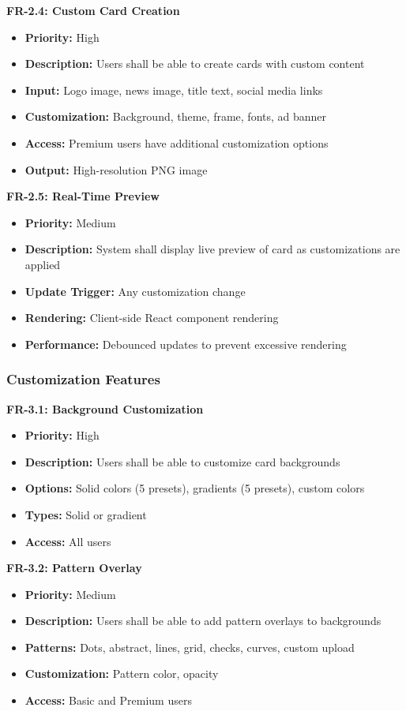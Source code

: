 \documentclass[12pt,a4paper]{article}
\begin{document}
\textbf{FR-2.4: Custom Card Creation}
\begin{itemize}
    \item \textbf{Priority:} High
    \item \textbf{Description:} Users shall be able to create cards with custom content
    \item \textbf{Input:} Logo image, news image, title text, social media links
    \item \textbf{Customization:} Background, theme, frame, fonts, ad banner
    \item \textbf{Access:} Premium users have additional customization options
    \item \textbf{Output:} High-resolution PNG image
\end{itemize}

\textbf{FR-2.5: Real-Time Preview}
\begin{itemize}
    \item \textbf{Priority:} Medium
    \item \textbf{Description:} System shall display live preview of card as customizations are applied
    \item \textbf{Update Trigger:} Any customization change
    \item \textbf{Rendering:} Client-side React component rendering
    \item \textbf{Performance:} Debounced updates to prevent excessive rendering
\end{itemize}

\subsubsection{Customization Features}

\textbf{FR-3.1: Background Customization}
\begin{itemize}
    \item \textbf{Priority:} High
    \item \textbf{Description:} Users shall be able to customize card backgrounds
    \item \textbf{Options:} Solid colors (5 presets), gradients (5 presets), custom colors
    \item \textbf{Types:} Solid or gradient
    \item \textbf{Access:} All users
\end{itemize}

\textbf{FR-3.2: Pattern Overlay}
\begin{itemize}
    \item \textbf{Priority:} Medium
    \item \textbf{Description:} Users shall be able to add pattern overlays to backgrounds
    \item \textbf{Patterns:} Dots, abstract, lines, grid, checks, curves, custom upload
    \item \textbf{Customization:} Pattern color, opacity
    \item \textbf{Access:} Basic and Premium users
\end{itemize}
\end{document}
